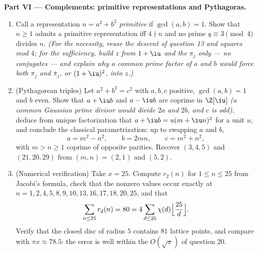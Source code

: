 \begin{problem}
\medskip
\noindent\textbf{Part VI --- Complements: primitive
representations and Pythagoras.}
\begin{enumerate}[resume]
  \item Call a representation $n = a^2 + b^2$ \emph{primitive}
        if $\gcd(a, b) = 1$. Show that $n \geq 1$ admits a
        primitive representation iff $4 \nmid n$ and no prime
        $q \equiv 3 \pmod 4$ divides $n$. \emph{(For the
        necessity, reuse the descent of question 13 and squares
        mod $4$; for the sufficiency, build $z$ from $1 + \iu$
        and the $\pi_j$ only --- no conjugates --- and explain
        why a common prime factor of $a$ and $b$ would force
        both $\pi_j$ and $\bar\pi_j$, or $(1+\iu)^2$, into
        $z$.)}
  \item (Pythagorean triples) Let $a^2 + b^2 = c^2$ with $a, b,
        c$ positive, $\gcd(a, b) = 1$ and $b$ even. Show that
        $a + \iu b$ and $a - \iu b$ are coprime in $\Z[\iu]$
        \emph{(a common Gaussian prime divisor would divide
        $2a$ and $2b$, and $c$ is odd)}, deduce from unique
        factorization that $a + \iu b = u(m + \iu n)^2$ for a
        unit $u$, and conclude the classical parametrization:
        up to swapping $a$ and $b$,
        \[
        a = m^2 - n^2, \qquad b = 2mn, \qquad c = m^2 + n^2,
        \]
        with $m > n \geq 1$ coprime of opposite parities.
        Recover $(3, 4, 5)$ and $(21, 20, 29)$ from $(m, n) =
        (2, 1)$ and $(5, 2)$.
  \item (Numerical verification) Take $x = 25$. Compute
        $r_2(n)$ for $1 \leq n \leq 25$ from Jacobi's formula,
        check that the nonzero values occur exactly at $n = 1,
        2, 4, 5, 8, 9, 10, 13, 16, 17, 18, 20, 25$, and that
        \[
        \sum_{n \leq 25} r_2(n) = 80
        = 4\sum_{d \leq 25}\chi(d)
        \Bigl\lfloor\frac{25}d\Bigr\rfloor .
        \]
        Verify that the closed disc of radius $5$ contains $81$
        lattice points, and compare with $\pi x \approx 78.5$:
        the error is well within the $O(\sqrt x)$ of question
        20.
\end{enumerate}
\end{problem}
